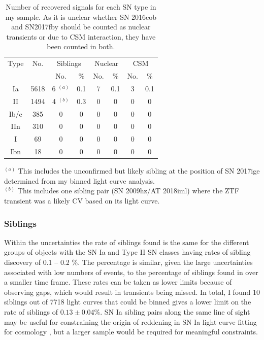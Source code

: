 \documentclass[a4paper,oneside,12pt, class=Latex/Classes/PhDthesisPSnPDF, crop=false]{standalone}
\begin{document}
\begin{table}[]
   \caption{Number of recovered signals for each SN type in my sample. As it is unclear whether SN 2016cob and SN2017fby should be counted as nuclear transients or due to CSM interaction, they have been counted in both.}
    \centering
    \begin{tabular}{cccccccc}
        \hline
        \hline
        Type & No.  & \multicolumn{2}{c}{Siblings}  & \multicolumn{2}{c}{Nuclear} &  \multicolumn{2}{c}{CSM}  \\
        && No. & \% & No. & \%& No. & \% \\
        \hline
        Ia & 5618 & 6 $^{(a)}$ & 0.1 & 7 & 0.1 & 3 & 0.1\\
        II & 1494 & 4 $^{(b)}$ & 0.3 &  0 & 0 & 0 & 0 \\
        Ib/c & 385 & 0 & 0 & 0 & 0 & 0 & 0 \\
        IIn & 310 & 0 & 0 & 0 & 0 & 0 & 0 \\
        I & 69 & 0 & 0 & 0 & 0 & 0 & 0 \\
       Ibn & 18 & 0 & 0 & 0 & 0 & 0 & 0 \\
        \hline
    \end{tabular}
     \label{recovered_obj_breakdown}
    \begin{flushleft}
        $^{(a)}$ This includes the unconfirmed but likely sibling at the position of SN 2017ige determined from my binned light curve analysis.  \\
        $^{(b)}$ This includes one sibling pair (SN 2009hz/AT 2018iml) where the ZTF transient was a likely CV based on its light curve. \\
    \end{flushleft}
\end{table}


\subsubsection{Siblings}
Within the uncertainties the rate of siblings found is the same for the different groups of objects with the SN Ia and Type II SN classes having rates of sibling discovery of 0.1 -- 0.2 \%. The percentage is similar, given the large uncertainties associated with low numbers of events, to the percentage of siblings found in \citet{Terwel_2024_paper1} over a smaller time frame. These rates can be taken as lower limits because of observing gaps, which would result in transients being missed. In total, I found 10 siblings out of 7718 light curves that could be binned gives a lower limit on the rate of siblings of $0.13\pm0.04\%$. SN Ia sibling pairs along the same line of sight may be useful for constraining the origin of reddening in SN Ia light curve fitting for cosmology \citep{DR2_siblings}, but a larger sample would be required for meaningful constraints. 
\end{document}
